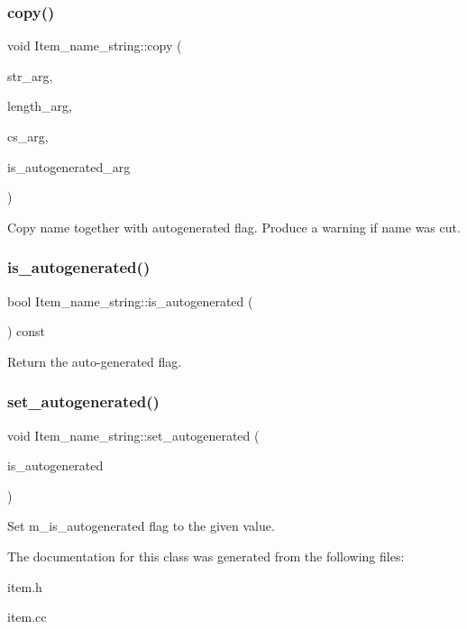 \subsubsection{\texorpdfstring{copy()}{copy()}\hspace{0.1cm}{\footnotesize\ttfamily [3/3]}}
{\footnotesize\ttfamily void Item\+\_\+name\+\_\+string\+::copy (\begin{DoxyParamCaption}\item[{const char $\ast$}]{str\+\_\+arg,  }\item[{size\+\_\+t}]{length\+\_\+arg,  }\item[{const C\+H\+A\+R\+S\+E\+T\+\_\+\+I\+N\+FO $\ast$}]{cs\+\_\+arg,  }\item[{bool}]{is\+\_\+autogenerated\+\_\+arg }\end{DoxyParamCaption})}

Copy name together with autogenerated flag. Produce a warning if name was cut. \mbox{\label{classItem__name__string_a1b3f79fa7f2163cb8b70fe9af585e7ea}} 
\subsubsection{\texorpdfstring{is\+\_\+autogenerated()}{is\_autogenerated()}}
{\footnotesize\ttfamily bool Item\+\_\+name\+\_\+string\+::is\+\_\+autogenerated (\begin{DoxyParamCaption}{ }\end{DoxyParamCaption}) const\hspace{0.3cm}{\ttfamily [inline]}}

Return the auto-\/generated flag. \mbox{\label{classItem__name__string_a1adb2066d0911a1470f404f4bfbbc229}} 
\subsubsection{\texorpdfstring{set\+\_\+autogenerated()}{set\_autogenerated()}}
{\footnotesize\ttfamily void Item\+\_\+name\+\_\+string\+::set\+\_\+autogenerated (\begin{DoxyParamCaption}\item[{bool}]{is\+\_\+autogenerated }\end{DoxyParamCaption})\hspace{0.3cm}{\ttfamily [inline]}}

Set m\+\_\+is\+\_\+autogenerated flag to the given value. 

The documentation for this class was generated from the following files\+:\begin{DoxyCompactItemize}
\item 
item.\+h\item 
item.\+cc\end{DoxyCompactItemize}
